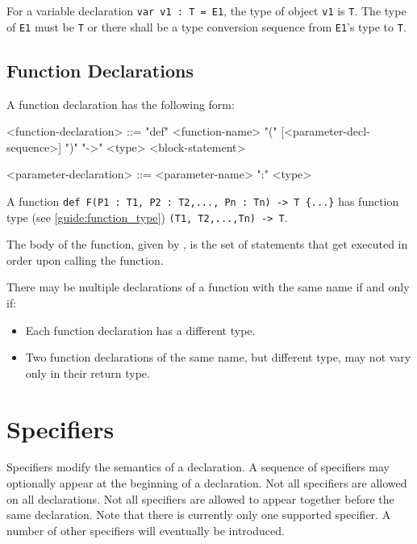 For a variable declaration \texttt{var v1 : T = E1}, the type of object \texttt{v1} is \texttt{T}. The type of \texttt{E1} must be \texttt{T} or there shall be a type conversion sequence from \texttt{E1}'s type to \texttt{T}. 

\subsection{Function Declarations} \label{guide:function}

A function declaration has the following form:

\begin{minip}
\begin{grammar}
<function-declaration> ::=
"def" <function-name> "(" [<parameter-decl-sequence>] ")" "->" <type> <block-statement>

<parameter-declaration> ::= <parameter-name> ":" <type>
\end{grammar}
\end{minip}

A function \texttt{def F(P1 : T1, P2 : T2,..., Pn : Tn) -> T \{...\}} has function type (see \ref{guide:function_type}) \texttt{(T1, T2,...,Tn) -> T}.

The body of the function, given by , is the set of statements that get executed in order upon calling the function.

There may be multiple declarations of a function with the same name if and only if:

\begin{itemize}
\item Each function declaration has a different type.
\item Two function declarations of the same name, but different type, may not vary only in their return type.
\end{itemize}

\section{Specifiers} \label{guide:specifications}

Specifiers modify the semantics of a declaration. A sequence of specifiers may optionally appear at the beginning of a declaration. Not all specifiers are allowed on all declarations. Not all specifiers are allowed to appear together before the same declaration. Note that there is currently only one supported specifier. A number of other specifiers will eventually be introduced.

